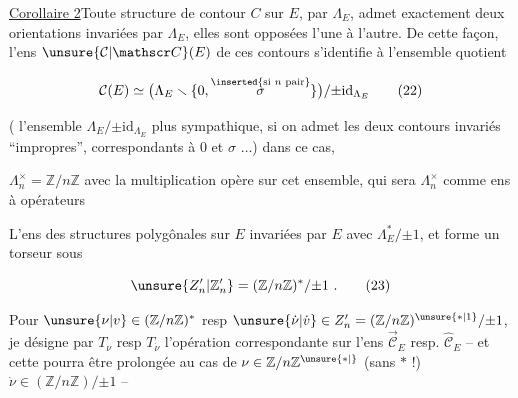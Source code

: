 
\uline{Corollaire 2}\quad Toute structure  de contour $C$
sur $E$,  par $\Lambda_E$, admet exactement
deux orientations invariées par $\Lambda_E$, elles sont
opposées l'une à l'autre. De cette façon, l'ens
$\unsure{\mathcal C|\mathscr C}(E)$ de ces contours s'identifie à l'ensemble
quotient

\[
 \mathcal C(E)\simeq\bigl(\Lambda_E\smallsetminus\{0,\overset{\inserted{\text{si }n\text{ pair}}}{\sigma}\}\bigr)/\mathord{\pm}\mathrm{id}_{\Lambda_E} \tag*{(22)}
\]

(  l'ensemble $\Lambda_E/\mathord{\pm}\mathrm{id}_{\Lambda_E}$ plus sympathique,
si on admet les deux contours invariés ``impropres'',
correspondants à $0$ et $\sigma$ $\ldots$) dans ce cas,

  $\Lambda_n^\times=\mathbb Z/n\mathbb Z$ avec la multiplication
opère sur cet ensemble, qui  sera
   $\Lambda_n^\times$ comme ens à opérateurs 

L'ens des structures  polygônales sur $E$
invariées par $E$  avec
$\Lambda_E^*/\mathord{\pm}1$, et forme un torseur sous 

\[
 \unsure{Z'_n|\mathbb Z'_n}=(\mathbb Z/n\mathbb Z)^*/\mathord{\pm}1\ . \tag*{(23)}
\]

Pour $\unsure{\nu|v}\in(\mathbb Z/n\mathbb Z)^*$ resp $\unsure{\dot\nu|\dot v}\in Z'_n=(\mathbb Z/n\mathbb Z)^{\unsure{*|1}}/\mathord{\pm}1$,
je désigne par $T_\nu$ resp $T_{\dot\nu}$ l'opération
correspondante sur l'ens $\overrightarrow{\mathcal C}_E$ resp. $\widehat{\mathcal C}_E$ --
et cette   pourra
être prolongée au cas de $\nu\in\mathbb Z/n\mathbb Z^{\unsure{*|\vphantom{1}}}$ (sans $*$ !)
$\dot\nu\in(\mathbb Z/n\mathbb Z)/\mathord{\pm}1$ --

